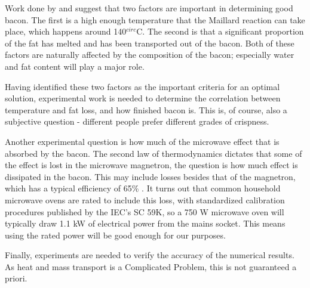 Work done by \cite{intarwebz} and \cite{maillard} suggest that two factors are important in
determining good bacon. The first is a high enough temperature that the Maillard
reaction can take place, which happens around 140$^{circ}$C. The second is that
a significant proportion of the fat has melted and has been transported out of
the bacon. Both of these factors are naturally affected by the composition of
the bacon; especially water and fat content will play a major role.

Having identified these two factors as the important criteria for an optimal
solution, experimental work is needed to determine the correlation between
temperature and fat loss, and how finished bacon is. This is, of course, also a
subjective question - different people prefer different grades of crispness.

Another experimental question is how much of the microwave effect that is
absorbed by the bacon. The second law of thermodynamics dictates that some of
the effect is lost in the microwave magnetron, the question is how much effect
is dissipated in the bacon. This may include losses besides that of the
magnetron, which has a typical efficiency of 65\% \cite{namba}. It turns out
that common household microwave ovens are rated to include this loss,
with standardized calibration procedures published by the IEC's SC 59K, so a 750 W
microwave oven will typically draw 1.1 kW of electrical power from the mains
socket. This means using the rated power will be good enough for our purposes.

Finally, experiments are needed to verify the accuracy of the numerical results.
As heat and mass transport is a Complicated Problem, this is not guaranteed a
priori.

\setcounter{secnumdepth}{2}
